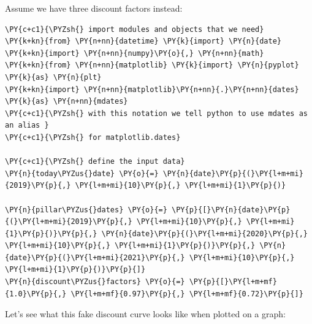 Assume we have three discount factors instead:
\begin{tcolorbox}[breakable, size=fbox, boxrule=1pt, pad at break*=1mm,colback=cellbackground, colframe=cellborder]
\begin{Verbatim}[commandchars=\\\{\}]
\PY{c+c1}{\PYZsh{} import modules and objects that we need}
\PY{k+kn}{from} \PY{n+nn}{datetime} \PY{k}{import} \PY{n}{date}
\PY{k+kn}{import} \PY{n+nn}{numpy}\PY{o}{,} \PY{n+nn}{math}
\PY{k+kn}{from} \PY{n+nn}{matplotlib} \PY{k}{import} \PY{n}{pyplot} \PY{k}{as} \PY{n}{plt}
\PY{k+kn}{import} \PY{n+nn}{matplotlib}\PY{n+nn}{.}\PY{n+nn}{dates} \PY{k}{as} \PY{n+nn}{mdates} 
\PY{c+c1}{\PYZsh{} with this notation we tell python to use mdates as an alias }
\PY{c+c1}{\PYZsh{} for matplotlib.dates}

\PY{c+c1}{\PYZsh{} define the input data}
\PY{n}{today\PYZus{}date} \PY{o}{=} \PY{n}{date}\PY{p}{(}\PY{l+m+mi}{2019}\PY{p}{,} \PY{l+m+mi}{10}\PY{p}{,} \PY{l+m+mi}{1}\PY{p}{)}

\PY{n}{pillar\PYZus{}dates} \PY{o}{=} \PY{p}{[}\PY{n}{date}\PY{p}{(}\PY{l+m+mi}{2019}\PY{p}{,} \PY{l+m+mi}{10}\PY{p}{,} \PY{l+m+mi}{1}\PY{p}{)}\PY{p}{,} \PY{n}{date}\PY{p}{(}\PY{l+m+mi}{2020}\PY{p}{,} \PY{l+m+mi}{10}\PY{p}{,} \PY{l+m+mi}{1}\PY{p}{)}\PY{p}{,} \PY{n}{date}\PY{p}{(}\PY{l+m+mi}{2021}\PY{p}{,} \PY{l+m+mi}{10}\PY{p}{,} \PY{l+m+mi}{1}\PY{p}{)}\PY{p}{]}
\PY{n}{discount\PYZus{}factors} \PY{o}{=} \PY{p}{[}\PY{l+m+mf}{1.0}\PY{p}{,} \PY{l+m+mf}{0.97}\PY{p}{,} \PY{l+m+mf}{0.72}\PY{p}{]}
\end{Verbatim}
\end{tcolorbox}
    
Let's see what this fake discount curve looks like when plotted on a graph:

